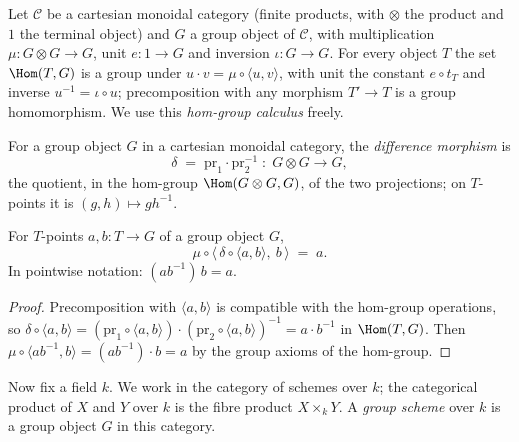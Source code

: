 Let \(\mathcal C\) be a cartesian monoidal category (finite products, with
\(\otimes\) the product and \(1\) the terminal object) and \(G\) a group object
of \(\mathcal C\), with multiplication \(\mu : G \otimes G \to G\), unit
\(e : 1 \to G\) and inversion \(\iota : G \to G\). For every object \(T\) the
set \(\Hom(T, G)\) is a group under \(u \cdot v = \mu \circ \langle u,
v\rangle\), with unit the constant \(e \circ t_T\) and inverse
\(u^{-1} = \iota \circ u\); precomposition with any morphism \(T' \to T\) is a
group homomorphism. We use this \emph{hom-group calculus} freely.

\begin{definition}
  \label{def:grp_diff}
  \leanok
  For a group object \(G\) in a cartesian monoidal category, the
  \emph{difference morphism} is
  \[
    \delta \;=\; \mathrm{pr}_1 \cdot \mathrm{pr}_2^{-1}
    \;:\; G \otimes G \longrightarrow G,
  \]
  the quotient, in the hom-group \(\Hom(G \otimes G, G)\), of the two
  projections; on \(T\)-points it is \((g, h) \mapsto g h^{-1}\).
\end{definition}

\begin{lemma}
  \label{lem:grp_diff_reconstruct}
  \leanok
  For \(T\)-points \(a, b : T \to G\) of a group object \(G\),
  \[
    \mu \circ \bigl\langle\, \delta \circ \langle a, b\rangle,\ b \,\bigr\rangle
    \;=\; a .
  \]
  In pointwise notation: \((a b^{-1})\, b = a\).
\end{lemma}
\begin{proof}
  \leanok
  Precomposition with \(\langle a, b\rangle\) is compatible with the hom-group
  operations, so
  \(\delta \circ \langle a, b\rangle
  = (\mathrm{pr}_1 \circ \langle a,b\rangle)\cdot(\mathrm{pr}_2 \circ
  \langle a,b\rangle)^{-1} = a \cdot b^{-1}\) in \(\Hom(T, G)\). Then
  \(\mu \circ \langle a b^{-1}, b\rangle = (a b^{-1}) \cdot b = a\) by the group
  axioms of the hom-group.
\end{proof}

Now fix a field \(k\). We work in the category of schemes over \(k\); the
categorical product of \(X\) and \(Y\) over \(k\) is the fibre product
\(X \times_k Y\). A \emph{group scheme} over \(k\) is a group object \(G\) in
this category.

